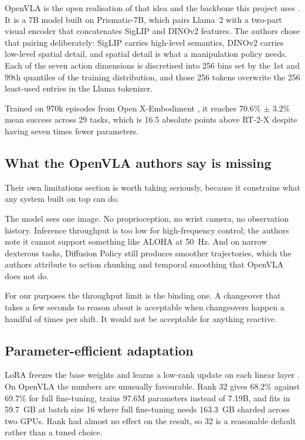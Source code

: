 \documentclass[conference]{IEEEtran}
\begin{document}
OpenVLA is the open realisation of that idea and the backbone this
project uses \cite{openvla}. It is a 7B model built on Prismatic-7B,
which pairs Llama~2 with a two-part visual encoder that concatenates
SigLIP and DINOv2 features. The authors chose that pairing deliberately:
SigLIP carries high-level semantics, DINOv2 carries low-level spatial
detail, and spatial detail is what a manipulation policy needs. Each of
the seven action dimensions is discretised into 256 bins set by the 1st
and 99th quantiles of the training distribution, and those 256 tokens
overwrite the 256 least-used entries in the Llama tokenizer.

Trained on 970k episodes from Open X-Embodiment \cite{openx}, it reaches
70.6\% $\pm$ 3.2\% mean success across 29 tasks, which is 16.5 absolute
points above RT-2-X despite having seven times fewer parameters.

\subsection{What the OpenVLA authors say is missing}

Their own limitations section is worth taking seriously, because it
constrains what any system built on top can do.

The model sees one image. No proprioception, no wrist camera, no
observation history. Inference throughput is too low for high-frequency
control; the authors note it cannot support something like ALOHA at
50~Hz. And on narrow dexterous tasks, Diffusion Policy still produces
smoother trajectories, which the authors attribute to action chunking and
temporal smoothing that OpenVLA does not do.

For our purposes the throughput limit is the binding one. A changeover
that takes a few seconds to reason about is acceptable when changeovers
happen a handful of times per shift. It would not be acceptable for
anything reactive.

\subsection{Parameter-efficient adaptation}

LoRA freezes the base weights and learns a low-rank update on each linear
layer \cite{lora}. On OpenVLA the numbers are unusually favourable. Rank
32 gives 68.2\% against 69.7\% for full fine-tuning, trains 97.6M
parameters instead of 7.19B, and fits in 59.7~GB at batch size 16 where
full fine-tuning needs 163.3~GB sharded across two GPUs. Rank had almost
no effect on the result, so 32 is a reasonable default rather than a
tuned choice.
\end{document}
